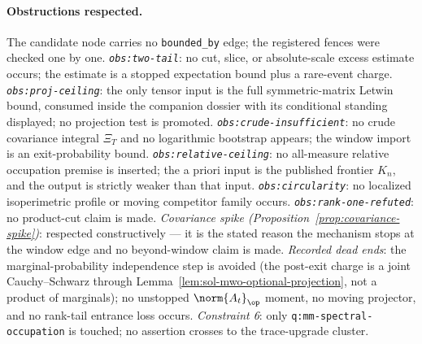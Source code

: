 \documentclass[../main.tex]{subfiles}
\begin{document}
\paragraph{Obstructions respected.}
The candidate node carries no \texttt{bounded\_by} edge; the registered fences were
checked one by one.
\emph{\texttt{obs:two-tail}}: no cut, slice, or absolute-scale excess estimate occurs;
the estimate is a stopped expectation bound plus a rare-event charge.
\emph{\texttt{obs:proj-ceiling}}: the only tensor input is the full symmetric-matrix
Letwin bound, consumed inside the companion dossier with its conditional standing
displayed; no projection test is promoted.
\emph{\texttt{obs:crude-insufficient}}: no crude covariance integral $\Xi_T$ and no
logarithmic bootstrap appears; the window import is an exit-probability bound.
\emph{\texttt{obs:relative-ceiling}}: no all-measure relative occupation premise is
inserted; the a priori input is the published frontier $K_n$, and the output is
strictly weaker than that input.
\emph{\texttt{obs:circularity}}: no localized isoperimetric profile or moving
competitor family occurs.
\emph{\texttt{obs:rank-one-refuted}}: no product-cut claim is made.
\emph{Covariance spike (Proposition~\ref{prop:covariance-spike})}: respected
constructively --- it is the stated reason the mechanism stops at the window edge and
no beyond-window claim is made.
\emph{Recorded dead ends}: the marginal-probability independence step is avoided (the
post-exit charge is a joint Cauchy--Schwarz through
Lemma~\ref{lem:sol-mwo-optional-projection}, not a product of marginals); no unstopped
$\norm{A_t}_\op$ moment, no moving projector, and no rank-tail entrance loss occurs.
\emph{Constraint 6}: only \texttt{q:mm-spectral-occupation} is touched; no assertion
crosses to the trace-upgrade cluster.

\end{document}
